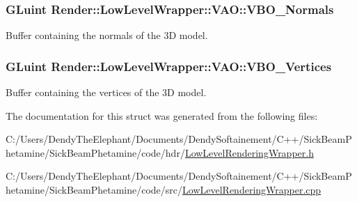 \subsubsection[{\texorpdfstring{V\+B\+O\+\_\+\+Normals}{VBO_Normals}}]{\setlength{\rightskip}{0pt plus 5cm}G\+Luint Render\+::\+Low\+Level\+Wrapper\+::\+V\+A\+O\+::\+V\+B\+O\+\_\+\+Normals}\hypertarget{struct_render_1_1_low_level_wrapper_1_1_v_a_o_a1fd9840e64e000d2cc5634bd15fbe76d}{}\label{struct_render_1_1_low_level_wrapper_1_1_v_a_o_a1fd9840e64e000d2cc5634bd15fbe76d}


Buffer containing the normals of the 3D model. 

\subsubsection[{\texorpdfstring{V\+B\+O\+\_\+\+Vertices}{VBO_Vertices}}]{\setlength{\rightskip}{0pt plus 5cm}G\+Luint Render\+::\+Low\+Level\+Wrapper\+::\+V\+A\+O\+::\+V\+B\+O\+\_\+\+Vertices}\hypertarget{struct_render_1_1_low_level_wrapper_1_1_v_a_o_a20979b47abd8e87579c9c96cf7222b38}{}\label{struct_render_1_1_low_level_wrapper_1_1_v_a_o_a20979b47abd8e87579c9c96cf7222b38}


Buffer containing the vertices of the 3D model. 



The documentation for this struct was generated from the following files\+:\begin{DoxyCompactItemize}
\item 
C\+:/\+Users/\+Dendy\+The\+Elephant/\+Documents/\+Dendy\+Softainement/\+C++/\+Sick\+Beam\+Phetamine/\+Sick\+Beam\+Phetamine/code/hdr/\hyperlink{_low_level_rendering_wrapper_8h}{Low\+Level\+Rendering\+Wrapper.\+h}\item 
C\+:/\+Users/\+Dendy\+The\+Elephant/\+Documents/\+Dendy\+Softainement/\+C++/\+Sick\+Beam\+Phetamine/\+Sick\+Beam\+Phetamine/code/src/\hyperlink{_low_level_rendering_wrapper_8cpp}{Low\+Level\+Rendering\+Wrapper.\+cpp}\end{DoxyCompactItemize}
